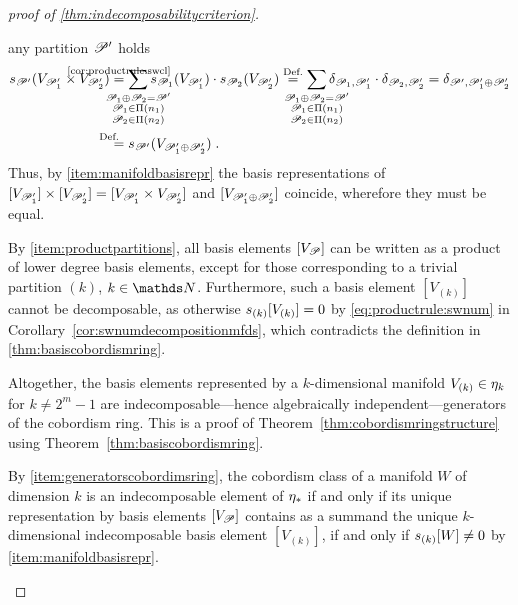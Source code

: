 \begin{proof}[proof of \autoref{thm:indecomposabilitycriterion}]
\begin{steps}
    any partition $\mathscr{P}'$ holds
    \begin{align*}
      \s{\Part'}(V_{\Part_1'}\times V_{\Part_2'})
      &\cequalsby{\ref{cor:productrule:swcl}}
        \sum_{\mathclap{\substack{
        \Part_1\concat\Part_2=\Part'\\
      \Part_1\in\PartitionsOf{n_1}\\
      \Part_2\in\PartitionsOf{n_2}\\
      }}}
      \s{\Part_1}(V_{\Part_1'}) \cdot \s{\Part_2}(V_{\Part_2'})
      \overset{\text{Def.}}=
        \sum_{\mathclap{\substack{
        \Part_1\concat\Part_2=\Part'\\
      \Part_1\in\PartitionsOf{n_1}\\
      \Part_2\in\PartitionsOf{n_2}\\
      }}}
      \delta_{\Part_1,\Part_1'} \cdot \delta_{\Part_2, \Part_2'}
      = \delta_{\Part', \Part_1'\concat\Part_2'}
      \\
      &\equalsby{Def.} \s{\Part'}(V_{\Part_1'\concat\Part_2'})
        \;.
    \end{align*}
    Thus, by \ref{item:manifoldbasisrepr}
    the basis representations of
    $[V_{\mathscr{P}_1'}]\times[V_{\mathscr{P}_2'}]=[V_{\mathscr{P}_1'}\times V_{\mathscr{P}_2'}]$
    and 
    $[V_{\mathscr{P}_1'\oplus\mathscr{P}_2'}]$
    coincide, wherefore they must be equal. 
  \item\label{item:generatorscobordimsring}
    By \ref{item:productpartitions}, all basis elements
    $[V_{\mathscr{P}}]$ can be written as a product of lower degree basis
    elements, except for those corresponding to a trivial partition
    $(k)$, $k\in\Nat$.
    Furthermore, such a basis element $[V_{(k)}]$ cannot be
    decomposable, as otherwise $s_{(k)}[V_{(k)}] = 0$
    by \autoref{eq:productrule:swnum} in
    Corollary~\autoref{cor:swnumdecompositionmfds},
    which contradicts the definition in
    \autoref{thm:basiscobordismring}.
    
    Altogether, the basis elements represented by a $k$-dimensional
    manifold $V_{(k)}\in\eta_k$ for $k\neq 2^m-1$ are
    indecomposable---hence algebraically independent---generators of
    the cobordism ring.
    This is a proof of Theorem~\ref{thm:cobordismringstructure} using
    Theorem~\ref{thm:basiscobordismring}.
  \item By \ref{item:generatorscobordimsring}, the cobordism
    class of a manifold $W$ of dimension $k$ is an indecomposable
    element of $\eta_*$ if and only if its unique representation by
    basis elements $[V_{\mathscr{P}}]$ contains as a summand the unique
    $k$-dimensional indecomposable basis element $[V_{(k)}]$,
    \idest if and only if $s_{(k)}[W]\neq 0$ by
    \ref{item:manifoldbasisrepr}.
    \qedhere
  \end{steps}
\end{proof}

